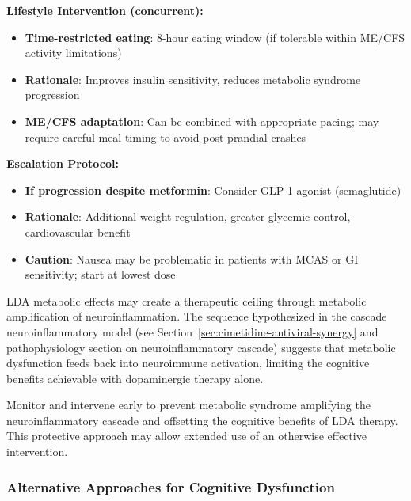 \begin{protocol}
\textbf{Lifestyle Intervention (concurrent):}
\begin{itemize}
    \item \textbf{Time-restricted eating}: 8-hour eating window (if tolerable within ME/CFS activity limitations)
    \item \textbf{Rationale}: Improves insulin sensitivity, reduces metabolic syndrome progression
    \item \textbf{ME/CFS adaptation}: Can be combined with appropriate pacing; may require careful meal timing to avoid post-prandial crashes
\end{itemize}

\textbf{Escalation Protocol:}
\begin{itemize}
    \item \textbf{If progression despite metformin}: Consider GLP-1 agonist (semaglutide)
    \item \textbf{Rationale}: Additional weight regulation, greater glycemic control, cardiovascular benefit
    \item \textbf{Caution}: Nausea may be problematic in patients with MCAS or GI sensitivity; start at lowest dose
\end{itemize}

\end{protocol}

\begin{warning}
\label{warn:lda-metabolic-neuroinflammatory}
LDA metabolic effects may create a therapeutic ceiling through metabolic amplification of neuroinflammation. The sequence hypothesized in the cascade neuroinflammatory model (see Section~\ref{sec:cimetidine-antiviral-synergy} and pathophysiology section on neuroinflammatory cascade) suggests that metabolic dysfunction feeds back into neuroimmune activation, limiting the cognitive benefits achievable with dopaminergic therapy alone.

Monitor and intervene early to prevent metabolic syndrome amplifying the neuroinflammatory cascade and offsetting the cognitive benefits of LDA therapy. This protective approach may allow extended use of an otherwise effective intervention.
\end{warning}

\subsubsection{Alternative Approaches for Cognitive Dysfunction}

